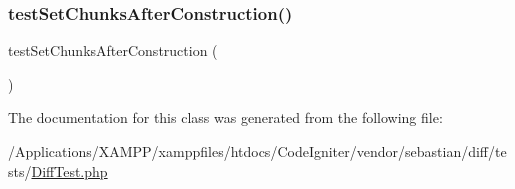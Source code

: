 \subsubsection{\texorpdfstring{test\+Set\+Chunks\+After\+Construction()}{testSetChunksAfterConstruction()}}
{\footnotesize\ttfamily test\+Set\+Chunks\+After\+Construction (\begin{DoxyParamCaption}{ }\end{DoxyParamCaption})}



The documentation for this class was generated from the following file\+:\begin{DoxyCompactItemize}
\item 
/\+Applications/\+X\+A\+M\+P\+P/xamppfiles/htdocs/\+Code\+Igniter/vendor/sebastian/diff/tests/\mbox{\hyperlink{_diff_test_8php}{Diff\+Test.\+php}}\end{DoxyCompactItemize}
